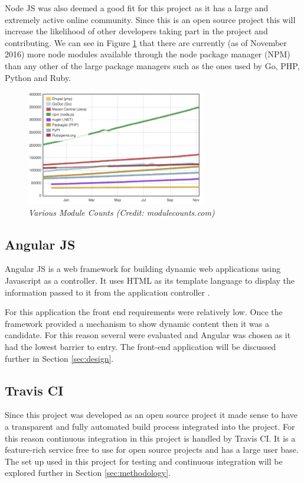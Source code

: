 Node JS was also deemed a good fit for this project as it has a large and extremely active online community. Since this is an open source project this will increase the likelihood of other developers taking part in the project and contributing. We can see in Figure \ref{fig:counts} that there are currently (as of November 2016) more node modules available through the node package manager (NPM) than any other of the large package managers such as the ones used by Go, PHP, Python and Ruby. 

\begin{figure}[!ht]
\centering
\includegraphics*[width=0.7\textwidth]{images/module_counts}
\caption{\em Various Module Counts (Credit: modulecounts.com)}
\label{fig:counts}
\end{figure}

\subsection{Angular JS}
Angular JS is a web framework for building dynamic web applications using Javascript as a controller. It uses HTML as its template language to display the information passed to it from the application controller \citep{Angular2017}. 

For this application the front end requirements were relatively low. Once the framework provided a mechanism to show dynamic content then it was a candidate. For this reason several were evaluated and Angular was chosen as it had the lowest barrier to entry. The front-end application will be discussed further in Section \ref{sec:design}.

\subsection{Travis CI}
Since this project was developed as an open source project it made sense to have a transparent and fully automated build process integrated into the project. For this reason \gls{continuous integration} in this project is handled by \gls{Travis} CI. It is a feature-rich service free to use for open source projects and has a large user base. The set up used in this project for testing and continuous integration will be explored further in Section \ref{sec:methodology}.

